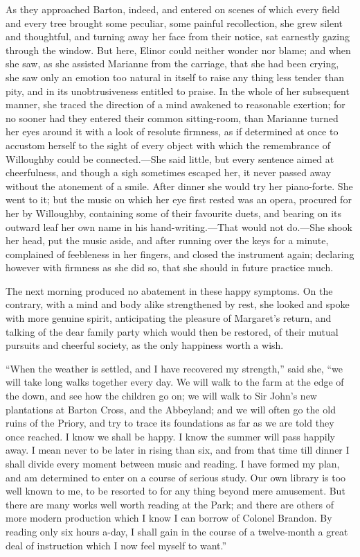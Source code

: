 \documentclass{article}
\begin{document}
As they approached Barton, indeed, and entered
on scenes of which every field and every tree brought
some peculiar, some painful recollection, she grew silent
and thoughtful, and turning away her face from their notice,
sat earnestly gazing through the window.  But here,
Elinor could neither wonder nor blame; and when she saw,
as she assisted Marianne from the carriage, that she
had been crying, she saw only an emotion too natural
in itself to raise any thing less tender than pity,
and in its unobtrusiveness entitled to praise.  In the
whole of her subsequent manner, she traced the direction
of a mind awakened to reasonable exertion; for no sooner
had they entered their common sitting-room, than Marianne
turned her eyes around it with a look of resolute firmness,
as if determined at once to accustom herself to the sight
of every object with which the remembrance of Willoughby could
be connected.---She said little, but every sentence aimed
at cheerfulness, and though a sigh sometimes escaped her,
it never passed away without the atonement of a smile.
After dinner she would try her piano-forte. She went to it;
but the music on which her eye first rested was an opera,
procured for her by Willoughby, containing some of their
favourite duets, and bearing on its outward leaf her own name
in his hand-writing.---That would not do.---She shook her head,
put the music aside, and after running over the keys
for a minute, complained of feebleness in her fingers,
and closed the instrument again; declaring however with firmness
as she did so, that she should in future practice much.

The next morning produced no abatement in these
happy symptoms.  On the contrary, with a mind and body
alike strengthened by rest, she looked and spoke with
more genuine spirit, anticipating the pleasure of
Margaret's return, and talking of the dear family party
which would then be restored, of their mutual pursuits
and cheerful society, as the only happiness worth a wish.

``When the weather is settled, and I have recovered
my strength,'' said she, ``we will take long walks together
every day.  We will walk to the farm at the edge of the down,
and see how the children go on; we will walk to Sir John's
new plantations at Barton Cross, and the Abbeyland;
and we will often go the old ruins of the Priory,
and try to trace its foundations as far as we are told
they once reached.  I know we shall be happy.  I know
the summer will pass happily away.  I mean never to be
later in rising than six, and from that time till dinner
I shall divide every moment between music and reading.
I have formed my plan, and am determined to enter on a course
of serious study.  Our own library is too well known to me,
to be resorted to for any thing beyond mere amusement.
But there are many works well worth reading at the Park;
and there are others of more modern production which I
know I can borrow of Colonel Brandon.  By reading only six
hours a-day, I shall gain in the course of a twelve-month
a great deal of instruction which I now feel myself to want.''
\end{document}
